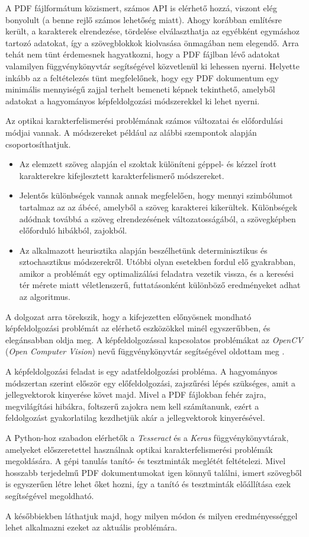 A PDF fájlformátum közismert, számos API is elérhető hozzá, viszont elég bonyolult (a benne rejlő számos lehetőség miatt).
Ahogy korábban említésre került, a karakterek elrendezése, tördelése elválaszthatja az egyébként egymáshoz tartozó adatokat, így a szövegblokkok kiolvasása önmagában nem elegendő.
Arra tehát nem tünt érdemesnek hagyatkozni, hogy a PDF fájlban lévő adatokat valamilyen függvénykönyvtár segítségével közvetlenül ki lehessen nyerni.
Helyette inkább az a feltételezés tünt megfelelőnek, hogy egy PDF dokumentum egy minimális mennyiségű zajjal terhelt bemeneti képnek tekinthető, amelyből adatokat a hagyományos képfeldolgozási módszerekkel ki lehet nyerni. 


Az optikai karakterfelismerési problémának számos változatai és előfordulási módjai vannak.
A módszereket például az alábbi szempontok alapján csoportosíthatjuk.
\begin{itemize}
\item Az elemzett szöveg alapján el szoktak különíteni géppel- és kézzel írott karakterekre kifejlesztett karakterfelismerő módszereket.
\item Jelentős különbségek vannak annak megfelelően, hogy mennyi szimbólumot tartalmaz az az ábécé, amelyből a szöveg karakterei kikerültek. Különbségek adódnak továbbá a szöveg elrendezésének változatosságából, a szövegképben előforduló hibákból, zajokból.
\item Az alkalmazott heurisztika alapján beszélhetünk determinisztikus és sztochasztikus módszerekről. Utóbbi olyan esetekben fordul elő gyakrabban, amikor a problémát egy optimalizálási feladatra vezetik vissza, és a keresési tér mérete miatt véletlenszerű, futtatásonként különböző eredményeket adhat az algoritmus.
\end{itemize}
A dolgozat arra törekszik, hogy a kifejezetten előnyösnek mondható képfeldolgozási problémát az elérhető eszközökkel minél egyszerűbben, és elegánsabban oldja meg.
A képfeldolgozással kapcsolatos problémákat az \textit{OpenCV} (\textit{Open Computer Vision}) nevű függvénykönyvtár segítségével oldottam meg \cite{opencv}.


A képfeldolgozási feladat is egy adatfeldolgozási probléma. A hagyományos módszertan szerint először egy előfeldolgozási, zajszűrési lépés szükséges, amit a jellegvektorok kinyerése követ majd.
Mivel a PDF fájlokban fehér zajra, megvilágítási hibákra, foltszerű zajokra nem kell számítanunk, ezért a feldolgozást gyakorlatilag kezdhetjük akár a jellegvektorok kinyerésével.

A Python-hoz szabadon elérhetők a \textit{Tesseract} \cite{patel2012optical} és a \textit{Keras} \cite{geron2019hands} függvénykönyvtárak, amelyeket előszeretettel használnak optikai karakterfelismerési problémák megoldására.
A gépi tanulás tanító- és tesztminták meglétét feltételezi. Mivel hosszabb terjedelmű PDF dokumentumokat igen könnyű találni, ismert szövegből is egyszerűen létre lehet őket hozni, így a tanító és tesztminták előállítása ezek segítségével megoldható.

A későbbiekben láthatjuk majd, hogy milyen módon és milyen eredményességgel lehet alkalmazni ezeket az aktuális problémára.

